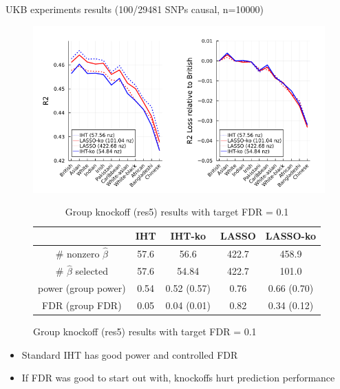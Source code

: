 \documentclass[aspectratio=169, 10pt]{beamer}
\begin{document}
\begin{frame}{UKB experiments results (100/29481 SNPs causal, n=10000)}
    \begin{minipage}[b]{0.65\linewidth}
        \begin{figure}
            \centering
            \includegraphics[width=\textwidth]{figures/k100_n10000.png}
            \begin{table}[]
                \centering
                \small
                \begin{tabular}{c|c|c|c|c}
                & IHT & IHT-ko & LASSO & LASSO-ko\\
                \hline
                 \# nonzero $\hat{\beta}$ & 57.6 & 56.6 & 422.7 & 458.9\\
                 \# $\hat{\beta}$ selected & 57.6 & 54.84 & 422.7 & 101.0\\
                 power (group power) & 0.54 & 0.52 (0.57) & 0.76 & 0.66 (0.70)\\
                 FDR (group FDR) & 0.05 & 0.04 (0.01) & 0.82 & 0.34 (0.12)\\
                 \hline
            \end{tabular}
            \caption{Group knockoff (res5) results with target FDR = 0.1}
    \end{table}
    \end{figure}
    
    \end{minipage}
    \hspace{0.5cm}
    \begin{minipage}[b]{0.25\linewidth}
        \begin{itemize}
            \item Standard IHT has good power and controlled FDR
            \item If FDR was good to start out with, knockoffs hurt prediction performance
        \end{itemize}
        \vspace{3cm}
    \end{minipage}
\end{frame}
\end{document}
